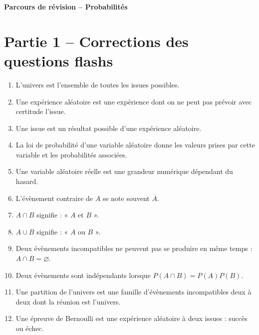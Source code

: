 \documentclass[11pt,a4paper]{article}
\newcounter{reponse}
\newenvironment{blocreponses}[1]{%
  \begin{tcolorbox}[
    enhanced,
    breakable,
    colback=bleuclair,
    colframe=bleufonce,
    boxrule=0.6pt,
    arc=2mm,
    left=2mm,right=2mm,top=2mm,bottom=1.5mm,
    title={\bfseries #1},
    coltitle=white,
    colbacktitle=bleufonce,
    before skip=3mm,
    after skip=3mm, fontupper=\large
  ]
  \large
  \begin{enumerate}[leftmargin=*,label=\textbf{\arabic*.},itemsep=0.45em,topsep=0.5em]
  \setcounter{enumi}{\value{reponse}}
}{%
  \setcounter{reponse}{\value{enumi}}
  \end{enumerate}
  \end{tcolorbox}
}
\begin{document}
\begin{center}
{\LARGE\bfseries Parcours de révision -- Probabilités}\\[1mm]

\end{center}

\vspace{1mm}
\tableofcontents
\clearpage

\section*{Partie 1 -- Corrections des questions flashs}
\setcounter{reponse}{0}

\begin{blocreponses}{Réponses -- A. Vocabulaire essentiel}
  \item L'univers est l'ensemble de toutes les issues possibles.
  \item Une expérience aléatoire est une expérience dont on ne peut pas prévoir avec certitude l'issue.
  \item Une issue est un résultat possible d'une expérience aléatoire.
  \item La loi de probabilité d'une variable aléatoire donne les valeurs prises par cette variable et les probabilités associées.
  \item Une variable aléatoire réelle est une grandeur numérique dépendant du hasard.
  \item L'évènement contraire de $A$ se note souvent $\overline A$.
  \item $A\cap B$ signifie : « $A$ et $B$ ».
  \item $A\cup B$ signifie : « $A$ ou $B$ ».
  \item Deux évènements incompatibles ne peuvent pas se produire en même temps : $A\cap B=\varnothing$.
  \item Deux évènements sont indépendants lorsque $P(A\cap B)=P(A)P(B)$.
  \item Une partition de l'univers est une famille d'évènements incompatibles deux à deux dont la réunion est l'univers.
  \item Une épreuve de Bernoulli est une expérience aléatoire à deux issues : succès ou échec.
\end{blocreponses}
\end{document}
